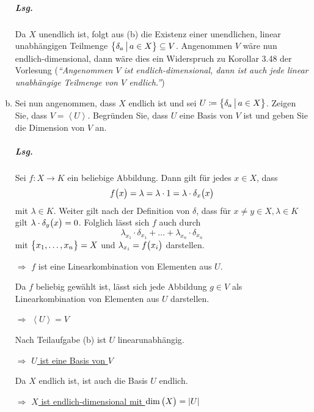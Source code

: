 \documentclass{scrreprt}
\newcommand\hull[1]{\left\langle #1 \right\rangle}
\begin{document}
\begin{enumerate}[(a)]
  \subparagraph{Lsg.} Da $X$ unendlich ist, folgt aus (b) die Existenz einer
  unendlichen, linear unabhängigen Teilmenge
  $\qty\big{\delta_a \, {\big |} \, a \in X} \subseteq V$.
  Angenommen $V$ wäre nun endlich-dimensional, dann wäre dies ein Widerspruch
  zu Korollar 3.48 der Vorlesung (\emph{``Angenommen $V$ ist endlich-dimensional,
    dann ist auch jede linear unabhängige Teilmenge von $V$ endlich.''})

\item Sei nun angenommen, dass $X$ endlich ist und sei
  $U \coloneqq \qty\big{\delta_a \,{\big |}\, a \in X}$.
  Zeigen Sie, dass $V = \hull{U}$.
  Begründen Sie, dass $U$ eine Basis von $V$ ist und geben Sie die
  Dimension von $V$ an.

  \subparagraph{Lsg.} Sei $f \colon X \to K$ ein beliebige Abbildung.
  Dann gilt für jedes $x \in X$, dass
  \[
    f\qty\big(x) = \lambda = \lambda \cdot 1 = \lambda \cdot \delta_x\qty\big(x)
  \]
  mit $\lambda \in K$.
  Weiter gilt nach der Definition von $\delta$, dass für
  $x \ne y \in X, \lambda \in K$ gilt  $\lambda \cdot \delta_y\qty\big(x) = 0$.
  Folglich lässt sich $f$ auch durch
  \[
    \lambda_{x_1} \cdot \delta_{x_1} + \ldots + \lambda_{x_n} \cdot \delta_{x_n}
  \]
  mit $\qty\big{x_1, \ldots, x_n} = X$ und $\lambda_{x_i} = f\qty\big(x_i)$ darstellen.

  $\Rightarrow$ $f$ ist eine Linearkombination von Elementen aus $U$.

  Da $f$ beliebig gewählt ist, lässt sich jede Abbildung $g \in V$ als
  Linearkombination von Elementen aus $U$ darstellen.

  $\Rightarrow$ $\hull{U} = V$

  Nach Teilaufgabe (b) ist $U$ linearunabhängig.

  $\Rightarrow$ \underline{$U$ ist eine Basis von $V$}

  Da $X$ endlich ist, ist auch die Basis $U$ endlich.

  $\Rightarrow$ \underline{$X$ ist endlich-dimensional mit
    $\dim\qty\big(X) = \abs{U}$}
\end{enumerate}
\end{document}
